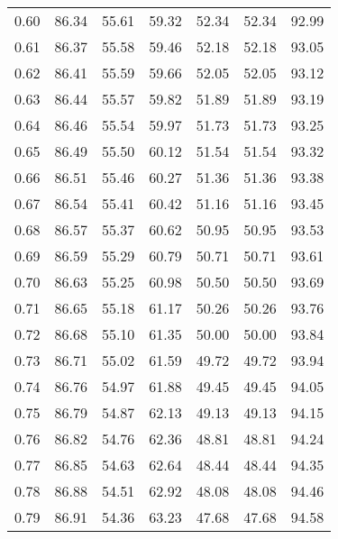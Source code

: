 \begin{tabular}{|c|c|c|c|c|c|c|}
      0.60 &     86.34 &     55.61 &      59.32 &   52.34 &      52.34 &         92.99 \\
      0.61 &     86.37 &     55.58 &      59.46 &   52.18 &      52.18 &         93.05 \\
      0.62 &     86.41 &     55.59 &      59.66 &   52.05 &      52.05 &         93.12 \\
      0.63 &     86.44 &     55.57 &      59.82 &   51.89 &      51.89 &         93.19 \\
      0.64 &     86.46 &     55.54 &      59.97 &   51.73 &      51.73 &         93.25 \\
      0.65 &     86.49 &     55.50 &      60.12 &   51.54 &      51.54 &         93.32 \\
      0.66 &     86.51 &     55.46 &      60.27 &   51.36 &      51.36 &         93.38 \\
      0.67 &     86.54 &     55.41 &      60.42 &   51.16 &      51.16 &         93.45 \\
      0.68 &     86.57 &     55.37 &      60.62 &   50.95 &      50.95 &         93.53 \\
      0.69 &     86.59 &     55.29 &      60.79 &   50.71 &      50.71 &         93.61 \\
      0.70 &     86.63 &     55.25 &      60.98 &   50.50 &      50.50 &         93.69 \\
      0.71 &     86.65 &     55.18 &      61.17 &   50.26 &      50.26 &         93.76 \\
      0.72 &     86.68 &     55.10 &      61.35 &   50.00 &      50.00 &         93.84 \\
      0.73 &     86.71 &     55.02 &      61.59 &   49.72 &      49.72 &         93.94 \\
      0.74 &     86.76 &     54.97 &      61.88 &   49.45 &      49.45 &         94.05 \\
      0.75 &     86.79 &     54.87 &      62.13 &   49.13 &      49.13 &         94.15 \\
      0.76 &     86.82 &     54.76 &      62.36 &   48.81 &      48.81 &         94.24 \\
      0.77 &     86.85 &     54.63 &      62.64 &   48.44 &      48.44 &         94.35 \\
      0.78 &     86.88 &     54.51 &      62.92 &   48.08 &      48.08 &         94.46 \\
      0.79 &     86.91 &     54.36 &      63.23 &   47.68 &      47.68 &         94.58 \\

\end{tabular}
